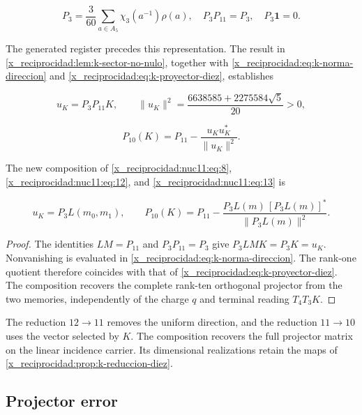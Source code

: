 \begin{equation}
P_3=\frac3{60}\sum_{a\in A_5}\chi_3(a^{-1})\rho(a),
\quad P_3P_{11}=P_3,\quad P_3\mathbf1=0.
\label{x_reciprocidad:nuc11:eq:12}
\end{equation}



The generated register precedes this representation. The result in \cref{x_reciprocidad:lem:k-sector-no-nulo}, together with \eqref{x_reciprocidad:eq:k-norma-direccion} and \eqref{x_reciprocidad:eq:k-proyector-diez}, establishes



\[
u_K=P_3P_{11}K,\qquad
\|u_K\|^2=\frac{6638585+2275584\sqrt5}{20}>0,
\]





\begin{equation}
P_{10}(K)=P_{11}-\frac{u_Ku_K^*}{\|u_K\|^2}.
\label{x_reciprocidad:nuc11:eq:13}
\end{equation}



The new composition of \eqref{x_reciprocidad:nuc11:eq:8}, \eqref{x_reciprocidad:nuc11:eq:12}, and \eqref{x_reciprocidad:nuc11:eq:13} is



\begin{equation}
\boxed{
u_K=P_3L(m_0,m_1),\qquad
P_{10}(K)=P_{11}-
\frac{P_3L(m)\,[P_3L(m)]^*}{\|P_3L(m)\|^2}.
}
\label{x_reciprocidad:nuc11:eq:14}
\end{equation}



\begin{proof}
The identities \(LM=P_{11}\) and \(P_3P_{11}=P_3\) give \(P_3LMK=P_3K=u_K\). Nonvanishing is evaluated in \eqref{x_reciprocidad:eq:k-norma-direccion}. The rank-one quotient therefore coincides with that of \eqref{x_reciprocidad:eq:k-proyector-diez}. The composition recovers the complete rank-ten orthogonal projector from the two memories, independently of the charge \(q\) and terminal reading \(T_4T_3K\).
\end{proof}

The reduction \(12\to11\) removes the uniform direction, and the reduction \(11\to10\) uses the vector selected by \(K\). The composition recovers the full projector matrix on the linear incidence carrier. Its dimensional realizations retain the maps of \cref{x_reciprocidad:prop:k-reduccion-diez}.

\subsection{Projector error}


